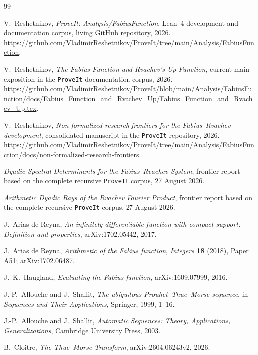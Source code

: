 \documentclass[11pt,oneside]{article}
\theoremstyle{definition}
\theoremstyle{remark}
\begin{document}
\begin{thebibliography}{99}

V.~Reshetnikov,
\emph{ProveIt: Analysis/FabiusFunction},
Lean~4 development and documentation corpus, living GitHub repository, 2026.
\url{https://github.com/VladimirReshetnikov/ProveIt/tree/main/Analysis/FabiusFunction}.

V.~Reshetnikov,
\emph{The Fabius Function and Rvachev's Up-Function},
current main exposition in the \texttt{ProveIt} documentation corpus, 2026.
\url{https://github.com/VladimirReshetnikov/ProveIt/blob/main/Analysis/FabiusFunction/docs/Fabius_Function_and_Rvachev_Up/Fabius_Function_and_Rvachev_Up.tex}.

V.~Reshetnikov,
\emph{Non-formalized research frontiers for the Fabius--Rvachev development},
consolidated manuscript in the \texttt{ProveIt} repository, 2026.
\url{https://github.com/VladimirReshetnikov/ProveIt/tree/main/Analysis/FabiusFunction/docs/non-formalized-research-frontiers}.

\emph{Dyadic Spectral Determinants for the Fabius--Rvachev System},
frontier report based on the complete recursive \texttt{ProveIt} corpus,
27 August 2026.

\emph{Arithmetic Dyadic Rays of the Rvachev Fourier Product},
frontier report based on the complete recursive \texttt{ProveIt} corpus,
27 August 2026.

J.~Arias de Reyna,
\emph{An infinitely differentiable function with compact support: Definition and properties},
arXiv:1702.05442, 2017.

J.~Arias de Reyna,
\emph{Arithmetic of the Fabius function},
\emph{Integers} \textbf{18} (2018), Paper A51;
arXiv:1702.06487.

J.~K.~Haugland,
\emph{Evaluating the Fabius function},
arXiv:1609.07999, 2016.

J.-P.~Allouche and J.~Shallit,
\emph{The ubiquitous Prouhet--Thue--Morse sequence},
in \emph{Sequences and Their Applications}, Springer, 1999, 1--16.

J.-P.~Allouche and J.~Shallit,
\emph{Automatic Sequences: Theory, Applications, Generalizations},
Cambridge University Press, 2003.

B.~Cloitre,
\emph{The Thue--Morse Transform},
arXiv:2604.06243v2, 2026.


\end{thebibliography}
\end{document}
